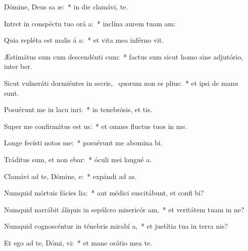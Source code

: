 \item Dómine, Deus sa æ:~* in die clamávi,    te.
\item Intret in conspéctu tuo orá a:~* inclína aurem tuam   am:
\item Quia repléta est malis á a:~* et vita mea inférno vit.
\item Æstimátus sum cum descendénti  cum:~* factus sum sicut homo sine adjutório, inter  ber.
\item Sicut vulneráti dormiéntes in secris,~\pscross{} quorum non es  plius:~* et ipsi de manu   sunt.
\item Posuérunt me in lacu inri:~* in tenebrósis, et   tis.
\item Super me confirmátus est  us:~* et omnes fluctus tuos in  me.
\item Longe fecísti notos   me:~* posuérunt me abomina bi.
\item Tráditus sum, et non ebar:~* óculi mei langué  a.
\item Clamávi ad te, Dómine,  e:~* expándi ad   as.
\item Numquid mórtuis fácies lia:~* aut médici suscitábunt, et confi bi?
\item Numquid narrábit áliquis in sepúlcro misericór am,~* et veritátem tuam in ne?
\item Numquid cognoscéntur in ténebris mirabí a,~* et justítia tua in terra nis?
\item Et ego ad te, Dómi, vi:~* et mane orátio mea  te.
